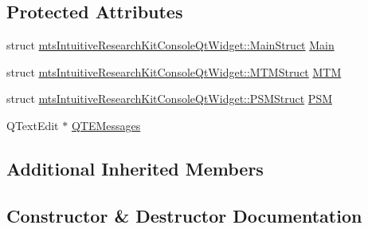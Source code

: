 \subsection*{Protected Attributes}
\begin{DoxyCompactItemize}
\item 
struct \hyperlink{structmts_intuitive_research_kit_console_qt_widget_1_1_main_struct}{mts\+Intuitive\+Research\+Kit\+Console\+Qt\+Widget\+::\+Main\+Struct} \hyperlink{classmts_intuitive_research_kit_console_qt_widget_a074965dc1a404088f4e32c5843aeaa94}{Main}
\item 
struct \hyperlink{structmts_intuitive_research_kit_console_qt_widget_1_1_m_t_m_struct}{mts\+Intuitive\+Research\+Kit\+Console\+Qt\+Widget\+::\+M\+T\+M\+Struct} \hyperlink{classmts_intuitive_research_kit_console_qt_widget_a0a6cea1fb1859503070a4c69a7af9219}{M\+T\+M}
\item 
struct \hyperlink{structmts_intuitive_research_kit_console_qt_widget_1_1_p_s_m_struct}{mts\+Intuitive\+Research\+Kit\+Console\+Qt\+Widget\+::\+P\+S\+M\+Struct} \hyperlink{classmts_intuitive_research_kit_console_qt_widget_a49312c620f564837efee52e371e81051}{P\+S\+M}
\item 
Q\+Text\+Edit $\ast$ \hyperlink{classmts_intuitive_research_kit_console_qt_widget_a093140f95bcc868675cf280ac128f697}{Q\+T\+E\+Messages}
\end{DoxyCompactItemize}
\subsection*{Additional Inherited Members}


\subsection{Constructor \& Destructor Documentation}
\hypertarget{classmts_intuitive_research_kit_console_qt_widget_a95818a1c10f8ab69daef0a2289ccd574}{}
